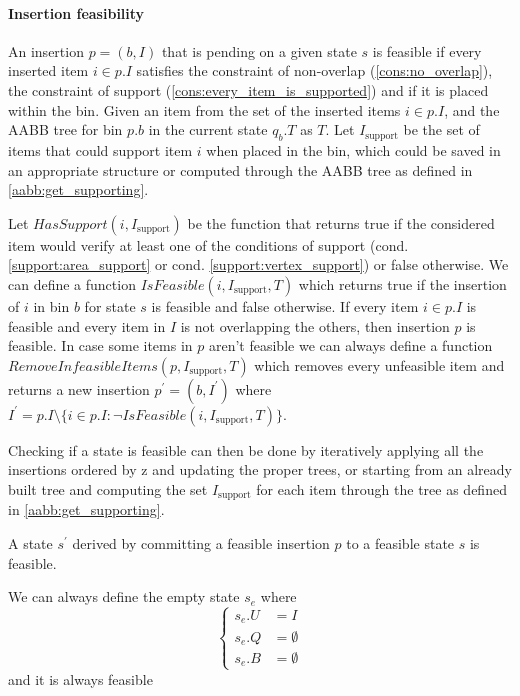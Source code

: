 

\paragraph*{Insertion feasibility}
An insertion $p = (b, I)$ that is pending on a given state $s$ is feasible if every inserted item $i \in p.I$ satisfies the constraint of non-overlap (\ref{cons:no_overlap}), the constraint of support (\ref{cons:every_item_is_supported}) and if it is placed within the bin.
Given an item from the set of the inserted items $i \in p.I$, and the AABB tree for bin $p.b$ in the current state $q_b.T$ as $T$.
Let $I_{\text{support}}$ be the set of items that could support item $i$ when placed in the bin, which could be saved in an appropriate structure or computed through the AABB tree as defined in \cref{aabb:get_supporting}.

Let $HasSupport(i, I_{\text{support}})$ be the function that returns true if the considered item would verify at least one of the conditions of support (cond. \ref{support:area_support} or cond. \ref{support:vertex_support}) or false otherwise.
We can define a function $IsFeasible(i, I_{\text{support}}, T)$ which returns true if the insertion of $i$ in bin $b$ for state $s$ is feasible and false otherwise. 
If every item $i \in p.I$ is feasible and every item in $I$ is not overlapping the others, then insertion $p$ is feasible.
In case some items in $p$ aren't feasible we can always define a function $RemoveInfeasibleItems(p, I_{\text{support}}, T)$ which removes every unfeasible item and returns a new insertion $p^\prime = (b, I^\prime)$ where $I^\prime = p.I \setminus \{i \in p.I : \lnot IsFeasible(i, I_{\text{support}}, T)\}$. \label{algo:remove_infeasible}

Checking if a state is feasible can then be done by iteratively applying all the insertions ordered by z and updating the proper trees, or starting from an already built tree and computing the set $I_{\text{support}}$ for each item through the tree as defined in \ref{aabb:get_supporting}.
\begin{proposition}
    \label{prop:feasible_expansion}
    A state $s^\prime$ derived by committing a feasible insertion $p$ to a feasible state $s$ is feasible.
\end{proposition}

\begin{observation}
    \label{def:empty_state}
    We can always define the empty state $s_e$ where \begin{equation*}
        \left\{ 
            \begin{aligned}
            s_e.U & = I \\
            s_e.Q & = \emptyset \\
            s_e.B & = \emptyset
            \end{aligned}
        \right.
    \end{equation*}
    and it is always feasible
\end{observation}

